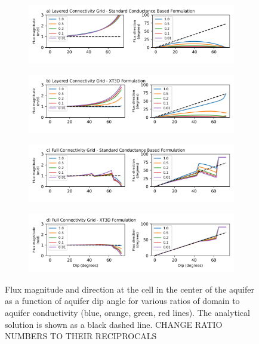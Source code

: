 \documentclass{article}
\begin{document}
\begin{figure}[p!]
\centering
\begin{subfigure}{0.9\textwidth}
	\includegraphics[width=\textwidth]{../figures/fig4_0_paper.png}
	\label{fig:fig4a}
\end{subfigure}
\begin{subfigure}{0.9\textwidth}
	\includegraphics[width=\textwidth]{../figures/fig4_1_paper.png}
	\label{fig:fig4b}
\end{subfigure}
\begin{subfigure}{0.9\textwidth}
	\includegraphics[width=\textwidth]{../figures/fig4_2_paper.png}
	\label{fig:fig4c}
\end{subfigure}
\begin{subfigure}{0.9\textwidth}
	\includegraphics[width=\textwidth]{../figures/fig4_3_paper.png}
	\label{fig:fig4d}
\end{subfigure}

\caption{Flux magnitude and direction at the cell in the center of the aquifer as a function of aquifer dip angle for various ratios of domain to aquifer conductivity (blue, orange, green, red lines). The analytical solution is shown as a black dashed line. {\color{red} CHANGE RATIO NUMBERS TO THEIR RECIPROCALS}}
\label{fig:figures}
\end{figure}
\end{document}
